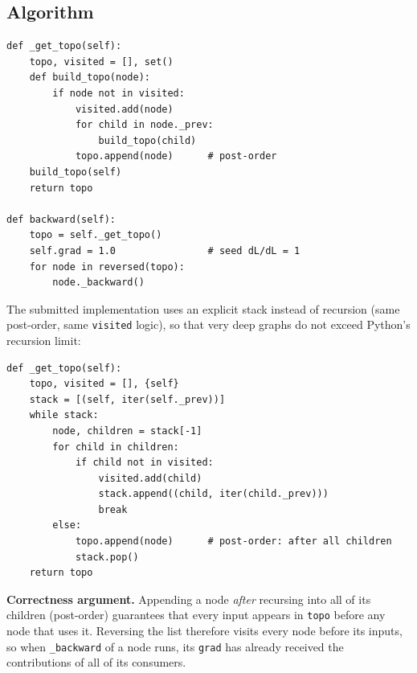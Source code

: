 \documentclass[11pt,a4paper]{article}
\begin{document}
\subsection{Algorithm}
\begin{lstlisting}
def _get_topo(self):
    topo, visited = [], set()
    def build_topo(node):
        if node not in visited:
            visited.add(node)
            for child in node._prev:
                build_topo(child)
            topo.append(node)      # post-order
    build_topo(self)
    return topo

def backward(self):
    topo = self._get_topo()
    self.grad = 1.0                # seed dL/dL = 1
    for node in reversed(topo):
        node._backward()
\end{lstlisting}
The submitted implementation uses an explicit stack instead of recursion (same post-order, same \texttt{visited} logic), so that very deep graphs do not exceed Python's recursion limit:
\begin{lstlisting}
def _get_topo(self):
    topo, visited = [], {self}
    stack = [(self, iter(self._prev))]
    while stack:
        node, children = stack[-1]
        for child in children:
            if child not in visited:
                visited.add(child)
                stack.append((child, iter(child._prev)))
                break
        else:
            topo.append(node)      # post-order: after all children
            stack.pop()
    return topo
\end{lstlisting}
\textbf{Correctness argument.} Appending a node \emph{after} recursing into all of its children (post-order) guarantees that every input appears in \texttt{topo} before any node that uses it. Reversing the list therefore visits every node before its inputs, so when \texttt{\_backward} of a node runs, its \texttt{grad} has already received the contributions of all of its consumers.
\end{document}

